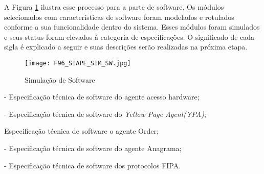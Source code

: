A Figura \ref{F96} ilustra esse processo para a parte de software. Os módulos selecionados com características de software foram modelados e rotulados conforme a sua funcionalidade dentro do sistema. Esses módulos foram simulados e seus status  foram elevados à categoria de especificações. O significado de cada sigla é explicado a seguir e suas descrições serão realizadas na próxima etapa. 		
		\begin{description}	
	
		 \begin{figure}[!h]
		 	\centering
		 	\texttt{[image: F96\_SIAPE\_SIM\_SW.jpg]} 
		 	\caption{Simulação de  Software                                                                                                                                                                                                                                                                                                                                                                                                                                                                                                                                                                                                                                                                                                                                                                                                                                                                                                                                                                                                                                                                                                                                                                                                                                                                                                                                     }
		 	\label{F96}
		 \end{figure}

		\item[9. EtSah] - Especificação técnica de software do agente acesso hardware;
		\item[10. EtSyp] - Especificação técnica de software do \textit{Yellow Page Agent(YPA)};
		\item[11. EtSao]  Especificação técnica de software o agente Order;
		\item[12. EtSan] - Especificação técnica de software do agente Anagrama;
		\item[13. EtSpf] - Especificação técnica de software dos protocolos FIPA.	
	\end{description}


